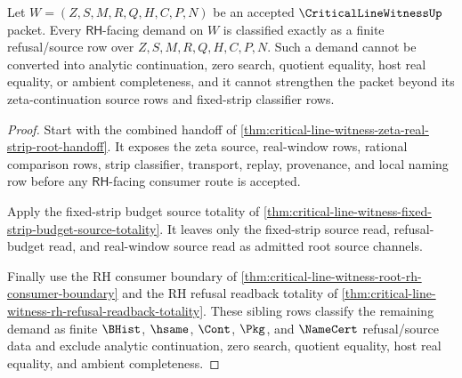 \begin{theorem}
\label{thm:critical-line-witness-rh-refusal-source-exactness}
Let $W=(Z,S,M,R,Q,H,C,P,N)$ be an accepted $\CriticalLineWitnessUp$ packet. Every $\mathsf{RH}$-facing demand on $W$ is classified exactly as a finite refusal/source row over $Z,S,M,R,Q,H,C,P,N$. Such a demand cannot be converted into analytic continuation, zero search, quotient equality, host real equality, or ambient completeness, and it cannot strengthen the packet beyond its zeta-continuation source rows and fixed-strip classifier rows.
\end{theorem}
\begin{proof}
Start with the combined handoff of \autoref{thm:critical-line-witness-zeta-real-strip-root-handoff}. It exposes the zeta source, real-window rows, rational comparison rows, strip classifier, transport, replay, provenance, and local naming row before any $\mathsf{RH}$-facing consumer route is accepted.

Apply the fixed-strip budget source totality of \autoref{thm:critical-line-witness-fixed-strip-budget-source-totality}. It leaves only the fixed-strip source read, refusal-budget read, and real-window source read as admitted root source channels.

Finally use the RH consumer boundary of \autoref{thm:critical-line-witness-root-rh-consumer-boundary} and the RH refusal readback totality of \autoref{thm:critical-line-witness-rh-refusal-readback-totality}. These sibling rows classify the remaining demand as finite $\BHist$, $\hsame$, $\Cont$, $\Pkg$, and $\NameCert$ refusal/source data and exclude analytic continuation, zero search, quotient equality, host real equality, and ambient completeness.
\end{proof}
